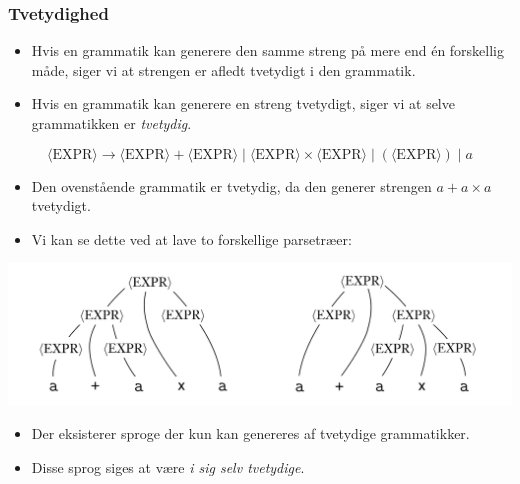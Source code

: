 \begin{frame}[allowframebreaks]
	\frametitle{Tvetydighed}

	\begin{itemize}
		\item Hvis en grammatik kan generere den samme streng på mere end én forskellig måde, siger vi at strengen er afledt tvetydigt i den grammatik.
		\item Hvis en grammatik kan generere en streng tvetydigt, siger vi at selve grammatikken er \textit{tvetydig}.
	\end{itemize}

	\begin{equation}
		\langle \text{EXPR} \rangle \rightarrow \langle \text{EXPR} \rangle + \langle \text{EXPR} \rangle \mid \langle \text{EXPR} \rangle \times \langle \text{EXPR} \rangle \mid ( \langle \text{EXPR} \rangle ) \mid a
	\end{equation}

	\begin{itemize}
		\item Den ovenstående grammatik er tvetydig, da den generer strengen $a+a \times a$ tvetydigt.
		\item Vi kan se dette ved at lave to forskellige parsetræer:
	\end{itemize}

	\begin{center}
		\includegraphics[scale=0.3]{figur/figur26.png}
	\end{center}
	\begin{itemize}
		\item Der eksisterer sproge der kun kan genereres af tvetydige grammatikker.
		\item Disse sprog siges at være \textit{i sig selv tvetydige}.
	\end{itemize}
\end{frame}

